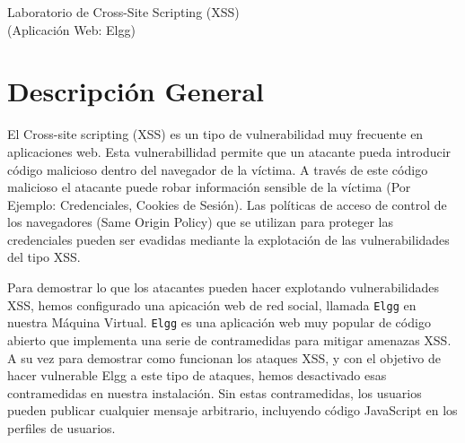 
\newcommand{\commonfolder}{../../common-files}
\newcommand{\webcommon}{../Web_Common}









\begin{center}
{\LARGE Laboratorio de Cross-Site Scripting (XSS)}
\vspace{0.1in}\\
{\Large (Aplicación Web: Elgg)}
\end{center}


\section{Descripción General}

El Cross-site scripting (XSS) es un tipo de vulnerabilidad muy frecuente en aplicaciones web. Esta vulnerabillidad permite que un atacante pueda introducir código malicioso dentro del navegador de la víctima. A través de este código malicioso el atacante puede robar información sensible de la víctima (Por Ejemplo: Credenciales, Cookies de Sesión). Las políticas de acceso de control de los navegadores (Same Origin Policy) que se utilizan para proteger las credenciales pueden ser evadidas mediante la explotación de las vulnerabilidades del tipo XSS.

Para demostrar lo que los atacantes pueden hacer explotando vulnerabilidades XSS, hemos configurado una apicación web de red social, llamada {\tt Elgg} en nuestra Máquina Virtual.
{\tt Elgg} es una aplicación web muy popular de código abierto que implementa una serie de contramedidas para mitigar amenazas XSS. A su vez para demostrar como funcionan los ataques XSS, y con el objetivo de hacer vulnerable Elgg a este tipo de ataques, hemos desactivado esas contramedidas en nuestra instalación.
Sin estas contramedidas, los usuarios pueden publicar cualquier mensaje arbitrario, incluyendo código JavaScript en los perfiles de usuarios.

